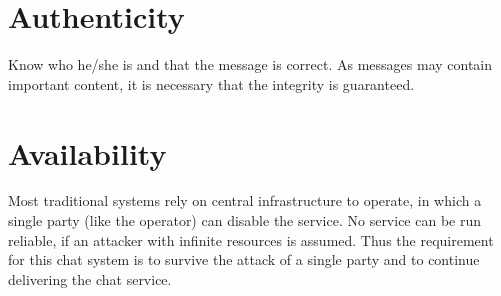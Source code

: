 \section{Authenticity}

Know who he/she is and that the message is correct.
As messages may contain important content, it is necessary that the integrity
is guaranteed.
\section{Availability}
Most traditional systems rely on central infrastructure to operate, in which a
single party (like the operator) can disable the service. 
No service can be run reliable, if an attacker with infinite resources is assumed.
Thus the requirement for this chat system is to survive the attack of a single
party and to continue delivering the chat service.
